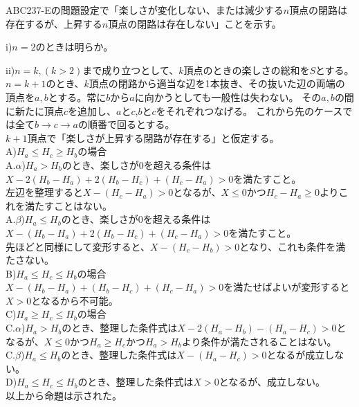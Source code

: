 \documentclass[a4paper,oneside,onecolumn,11pt]{jsarticle}
\begin{document}
	ABC237-Eの問題設定で「楽しさが変化しない、または減少する$n$頂点の閉路は存在するが、上昇する$n$頂点の閉路は存在しない」ことを示す。
	\par i)$n = 2$のときは明らか。
	\par ii)$n = k,(k > 2)$まで成り立つとして、$k$頂点のときの楽しさの総和を$S$とする。
			$n = k + 1$のとき、$k$頂点の閉路から適当な辺を1本抜き、その抜いた辺の両端の頂点を$a,b$とする。常に$b$から$a$に向かうとしても一般性は失わない。
			その$a,b$の間に新たに頂点$c$を追加し、$a$と$c$,$b$と$c$をそれぞれつなげる。	これから先のケースでは全て$b \rightarrow c \rightarrow a$の順番で回るとする。\\
			$k+1$頂点で「楽しさが上昇する閉路が存在する」と仮定する。\\
			A)$H_a \leq H_c \geq H_b$の場合\\
			A.$\alpha$)$H_a > H_b$のとき、楽しさが0を超える条件は$X - 2(H_b - H_a) + 2(H_b - H_c) + (H_c - H_a) > 0$を満たすこと。\\
			左辺を整理すると$X - (H_c - H_a) > 0$となるが、$X \leq 0$かつ$H_c - H_a \geq 0$よりこれを満たすことはない。\\
			A.$\beta$)$H_a \leq H_b$のとき、楽しさが0を超える条件は$X - (H_b - H_a) + 2(H_b - H_c) + (H_c - H_a) > 0$を満たすこと。\\
			先ほどと同様にして変形すると、$X - (H_c - H_b) > 0$となり、これも条件を満たさない。\\
			B)$H_a \leq H_c \leq H_b$の場合\\
			$X - (H_b - H_a) + (H_b - H_c) + (H_c - H_a) > 0$を満たせばよいが変形すると$X > 0$となるから不可能。\\
			C)$H_a \geq H_c \leq H_b$の場合\\
			C.$\alpha$)$H_a > H_b$のとき、整理した条件式は$X - 2(H_a - H_b) - (H_a - H_c) > 0$となるが、$X \leq 0$かつ$H_a \geq H_c$かつ$H_a > H_b$より条件が満たされることはない。\\
			C.$\beta$)$H_a \leq H_b$のとき、整理した条件式は$X - (H_a - H_c) > 0$となるが成立しない。\\
			D)$H_a \leq H_c \leq H_b$のとき、整理した条件式は$X > 0$となるが、成立しない。\\
	以上から命題は示された。
\end{document}
